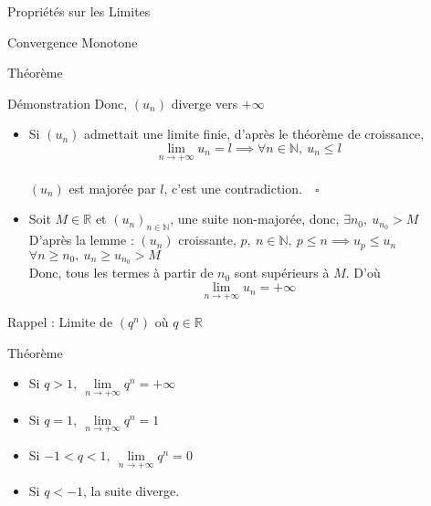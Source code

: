 \documentclass{cours}
\begin{document}
\begin{Gpartie}{Propriétés sur les Limites}
\begin{Spartie}{Convergence Monotone}
\begin{SSpartie}{Théorème}
\begin{SSSpartie}{Démonstration}
                    Donc, $(u_n)$ diverge vers $+\infty$
                    \begin{itemize}
                        \item Si $(u_n)$ admettait une limite finie, d'après le théorème de croissance, 
                        \[\lim\limits_{n\to +\infty}u_n=l\implies\forall n\in\mathbb{N},\ u_n\leq l\] \\ $(u_n)$ est majorée par $l$, c'est une contradiction.$\quad\square$
                        \\[2ex]
                        \item Soit $M\in\mathbb{R}$ et $(u_n)_{n\in\mathbb{N}}$, une suite non-majorée, donc, $\exists n_0,\ u_{n_0}>M$ \\ D'après la lemme : $(u_n)$ croissante, $p,\ n\in\mathbb{N},\ p\leq n\implies u_p\leq u_n$ \\ $\forall n\geq n_0,\ u_n\geq u_{n_0}>M$ \\ Donc, tous les termes à partir de $n_0$ sont supérieurs à $M$. D'où \[\lim\limits_{n\to +\infty}u_n=+\infty\]
                    \end{itemize}
                \end{SSSpartie}
            \end{SSpartie}
        \end{Spartie}
        \begin{Spartie}{Rappel : Limite de $\left(q^n\right)$ où $q\in\mathbb{R}$} 
            \begin{SSpartie}{Théorème} 
                \begin{itemize}
                    \setlength\itemsep{0.5em}
                    \item Si $q>1,\ \lim\limits_{n\to +\infty}q^n=+\infty$
                    \item Si $q=1,\ \lim\limits_{n\to +\infty}q^n=1$
                    \item Si $-1<q<1,\ \lim\limits_{n\to +\infty}q^n=0$
                    \item Si $q<-1$, la suite diverge.
                \end{itemize}
            \end{SSpartie}
        \end{Spartie}
    \end{Gpartie}
    \pagebreak
\end{document}
